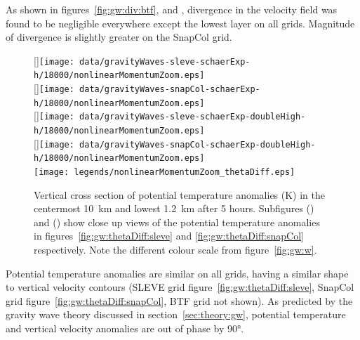 As shown in figures~\ref{fig:gw:div:btf},  and , divergence in the velocity field was found to be negligible everywhere except the lowest layer on all grids.  Magnitude of divergence is slightly greater on the SnapCol grid.

\begin{figure}
	\captionsetup[subfigure]{position=b}
	\centering
	[\textwidth]{\texttt{[image: data/gravityWaves-sleve-schaerExp-h/18000/nonlinearMomentumZoom.eps]}} \\
	[\textwidth]{\texttt{[image: data/gravityWaves-snapCol-schaerExp-h/18000/nonlinearMomentumZoom.eps]}} \\
	[\textwidth]{\texttt{[image: data/gravityWaves-sleve-schaerExp-doubleHigh-h/18000/nonlinearMomentumZoom.eps]}} \\
	[\textwidth]{\texttt{[image: data/gravityWaves-snapCol-schaerExp-doubleHigh-h/18000/nonlinearMomentumZoom.eps]}} \\
%
	\texttt{[image: legends/nonlinearMomentumZoom\_thetaDiff.eps]}
	\caption{Vertical cross section of potential temperature anomalies (\si{\kelvin}) in the centermost \SI{10}{\kilo\meter} and lowest \SI{1.2}{\kilo\meter} after 5 hours.  Subfigures () and () show close up views of the potential temperature anomalies in figures~\ref{fig:gw:thetaDiff:sleve} and \ref{fig:gw:thetaDiff:snapCol} respectively.  Note the different colour scale from figure~\ref{fig:gw:w}.}
	\label{fig:gw:thetaDiffZoom}
\end{figure}

Potential temperature anomalies are similar on all grids, having a similar shape to vertical velocity contours (SLEVE grid figure~\ref{fig:gw:thetaDiff:sleve}, SnapCol grid figure~\ref{fig:gw:thetaDiff:snapCol}, BTF grid not shown).  As predicted by the gravity wave theory discussed in section~\ref{sec:theory:gw}, potential temperature and vertical velocity anomalies are out of phase by \ang{90}.

